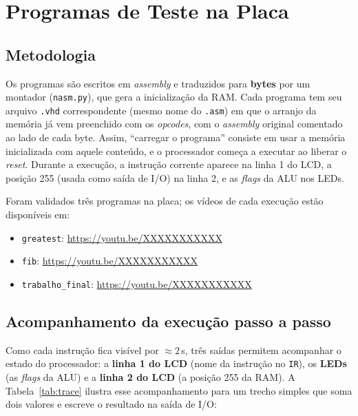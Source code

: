 \documentclass[12pt,a4paper]{article}
\begin{document}
\section{Programas de Teste na Placa}
\label{sec:testes}

\subsection{Metodologia}

Os programas são escritos em \textit{assembly} e traduzidos para \textbf{bytes} por um
montador (\texttt{nasm.py}), que gera a inicialização da RAM. Cada programa tem seu
arquivo \texttt{.vhd} correspondente (mesmo nome do \texttt{.asm}) em que o arranjo da
memória já vem preenchido com os \textit{opcodes}, com o \textit{assembly} original
comentado ao lado de cada byte. Assim, ``carregar o programa'' consiste em usar a memória
inicializada com aquele conteúdo, e o processador começa a executar ao liberar o
\textit{reset}. Durante a execução, a instrução corrente aparece na linha 1 do LCD, a
posição 255 (usada como saída de I/O) na linha 2, e as \textit{flags} da ALU nos LEDs.

Foram validados três programas na placa; os vídeos de cada execução estão disponíveis em:

\begin{itemize}
    \item \texttt{greatest}: \url{https://youtu.be/XXXXXXXXXXX}
    \item \texttt{fib}: \url{https://youtu.be/XXXXXXXXXXX}
    \item \texttt{trabalho\_final}: \url{https://youtu.be/XXXXXXXXXXX}
\end{itemize}

\subsection{Acompanhamento da execução passo a passo}

Como cada instrução fica visível por $\approx 2$\,s, três saídas permitem acompanhar o
estado do processador: a \textbf{linha 1 do LCD} (nome da instrução no \texttt{IR}), os
\textbf{LEDs} (as \textit{flags} da ALU) e a \textbf{linha 2 do LCD} (a posição 255 da RAM).
A Tabela~\ref{tab:trace} ilustra esse acompanhamento para um trecho simples que soma dois
valores e escreve o resultado na saída de I/O:
\end{document}
